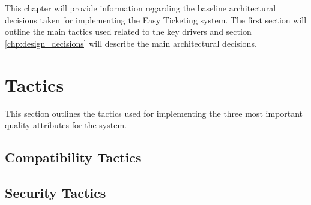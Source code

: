 This chapter will provide information regarding the baseline architectural decisions taken for implementing the Easy Ticketing system. The first section will outline the main tactics used related to the key drivers and section \ref{chp:design_decisions} will describe the main architectural decisions.
 
\section{Tactics}
This section outlines the tactics used for implementing the three most important quality attributes for the system.

\subsection{Compatibility Tactics}

\subsection{Security Tactics}


